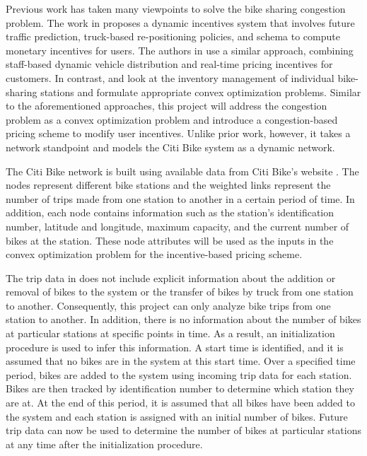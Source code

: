 \documentclass[times, 10pt,twocolumn]{article}
\begin{document}

Previous work has taken many viewpoints to solve the bike sharing congestion problem. The work in \cite{incentives} proposes a dynamic incentives system that involves future traffic prediction, truck-based re-positioning policies, and schema to compute monetary incentives for users. The authors in \cite{redistribution} use a similar approach, combining staff-based dynamic vehicle distribution and real-time pricing incentives for customers. In contrast, \cite{management} and \cite{redistribution} look at the inventory management of individual bike-sharing stations and formulate appropriate convex optimization problems. Similar to the aforementioned approaches, this project will address the congestion problem as a convex optimization problem and introduce a congestion-based pricing scheme to modify user incentives. Unlike prior work, however, it takes a network standpoint and models the Citi Bike system as a dynamic network.


The Citi Bike network is built using available data from Citi Bike's website \cite{dataset}. The nodes represent different bike stations and the weighted links represent the number of trips made from one station to another in a certain period of time. In addition, each node contains information such as the station's identification number, latitude and longitude, maximum capacity, and the current number of bikes at the station. These node attributes will be used as the inputs in the convex optimization problem for the incentive-based pricing scheme.

The trip data in \cite{dataset} does not include explicit information about the addition or removal of bikes to the system or the transfer of bikes by truck from one station to another. Consequently, this project can only analyze bike trips from one station to another. In addition, there is no information about the number of bikes at particular stations at specific points in time. As a result, an initialization procedure is used to infer this information. A start time is identified, and it is assumed that no bikes are in the system at this start time. Over a specified time period, bikes are added to the system using incoming trip data for each station. Bikes are then tracked by identification number to determine which station they are at. At the end of this period, it is assumed that all bikes have been added to the system and each station is assigned with an initial number of bikes. Future trip data can now be used to determine the number of bikes at particular stations at any time after the initialization procedure.
\end{document}
